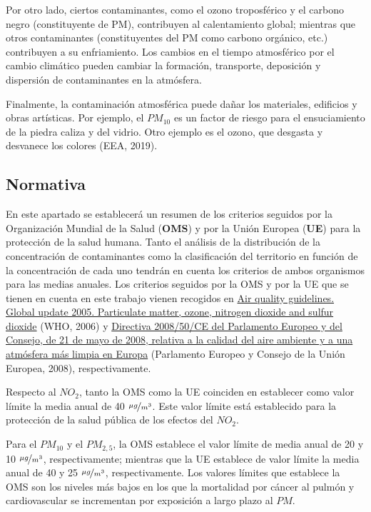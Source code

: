 \documentclass[12pt]{article}
\begin{document}
Por otro lado, ciertos contaminantes, como el ozono troposférico y el carbono negro (constituyente de PM), contribuyen al calentamiento global; mientras que otros contaminantes (constituyentes del PM como carbono orgánico, etc.) contribuyen a su enfriamiento. Los cambios en el tiempo atmosférico por el cambio climático pueden cambiar la formación, transporte, deposición y dispersión de contaminantes en la atmósfera.

Finalmente, la contaminación atmosférica puede dañar los materiales, edificios y obras artísticas. Por ejemplo, el $PM_{10}$ es un factor de riesgo para el ensuciamiento de la piedra caliza y del vidrio. Otro ejemplo es el ozono, que desgasta y desvanece los colores (EEA, 2019).

\subsection{Normativa}

En este apartado se establecerá un resumen de los criterios seguidos por la Organización Mundial de la Salud (\textbf{OMS}) y por la Unión Europea (\textbf{UE}) para la protección de la salud humana. Tanto el análisis de la distribución de la concentración de contaminantes como la clasificación del territorio en función de la concentración de cada uno tendrán en cuenta los criterios de ambos organismos para las medias anuales. Los criterios seguidos por la OMS y por la UE que se tienen en cuenta en este trabajo vienen recogidos en \href{http://www.euro.who.int/en/health-topics/environment-and-health/Housing-and-health/publications/pre-2009/air-quality-guidelines.-global-update-2005.-particulate-matter,-ozone,-nitrogen-dioxide-and-sulfur-dioxide}{Air quality guidelines. Global update 2005. Particulate matter, ozone, nitrogen dioxide and sulfur dioxide} (WHO, 2006) y \href{https://www.boe.es/buscar/doc.php?id=DOUE-L-2008-81053}{Directiva 2008/50/CE del Parlamento Europeo y del Consejo, de 21 de mayo de 2008, relativa a la calidad del aire ambiente y a una atmósfera más limpia en Europa} (Parlamento Europeo y Consejo de la Unión Europea, 2008), respectivamente.

Respecto al $NO_{2}$, tanto la OMS como la UE coinciden en establecer como valor límite la media anual de 40 $\nicefrac{\mu g}{m^{3}}$. Este valor límite está establecido para la protección de la salud pública de los efectos del $NO_{2}$.

Para el $PM_{10}$ y el $PM_{2,5}$, la OMS establece el valor límite de media anual de 20 y 10 $\nicefrac{\mu g}{m^{3}}$, respectivamente; mientras que la UE establece de valor límite la media anual de 40 y 25 $\nicefrac{\mu g}{m^{3}}$, respectivamente. Los valores límites que establece la OMS son los niveles más bajos en los que la mortalidad por cáncer al pulmón y cardiovascular se incrementan por exposición a largo plazo al $PM$.
\end{document}
